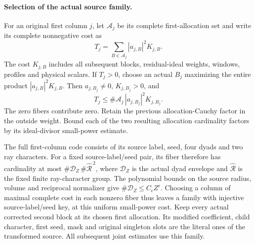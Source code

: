 \paragraph{Selection of the actual source family.}
For an original first column \(j\), let \(\mathcal A_j\) be its
complete first-allocation set and write its complete nonnegative cost as
\[
 T_j=\sum_{B\in\mathcal A_j}|a_{j,B}|^2K_{j,B}.
\]
The cost \(K_{j,B}\) includes all subsequent blocks, residual-ideal
weights, windows, profiles and physical scalars. If \(T_j>0\), choose
an actual \(B_j\) maximizing the entire product
\(|a_{j,B}|^2K_{j,B}\). Then \(a_{j,B_j}\ne0\), \(K_{j,B_j}>0\), and
\[
 T_j\le\#\mathcal A_j\,|a_{j,B_j}|^2K_{j,B_j}.
\]
The zero fibers contribute zero. Retain the previous allocation-Cauchy
factor in the outside weight. Bound each of the two resulting allocation
cardinality factors by its ideal-divisor small-power estimate.

The full first-column code consists of its source label, seed, four
dyads and two ray characters. For a fixed source-label/seed pair, its
fiber therefore has cardinality at most
\(\#\mathcal D_Z\,\#\widehat{\mathcal R}^{\,2}\), where
\(\mathcal D_Z\) is the actual dyad envelope and
\(\widehat{\mathcal R}\) is the fixed finite ray-character group.
The polynomial bounds on the source radius, volume and reciprocal
normalizer give \(\#\mathcal D_Z\le C_\epsilon Z^\epsilon\).
Choosing a column of maximal complete cost in each nonzero fiber thus
leaves a family with injective source-label/seed key, at this uniform
small-power cost. Keep every actual corrected second block at its
chosen first allocation. Its modified coefficient, child character,
first seed, mask and original singleton slots are the literal ones of
the transformed source. All subsequent joint estimates use this family.

